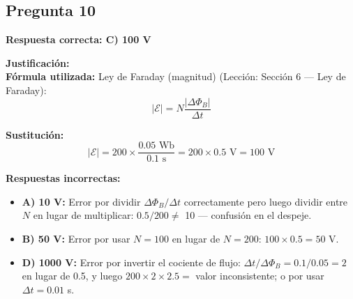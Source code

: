 \begin{respuestabox}
\subsection{Pregunta 10}
\textcolor{verdecorrecto}{\textbf{Respuesta correcta: C) 100 V}}

\textbf{Justificación:}\\
\textbf{Fórmula utilizada:} Ley de Faraday (magnitud) (Lección: Sección 6 — Ley de Faraday):
$$|\mathcal{E}| = N \frac{|\Delta\Phi_B|}{\Delta t}$$

\textbf{Sustitución:}
$$|\mathcal{E}| = 200 \times \frac{0.05 \text{ Wb}}{0.1 \text{ s}} = 200 \times 0.5 \text{ V} = 100 \text{ V}$$

\textbf{Respuestas incorrectas:}
\begin{itemize}
    \item \textbf{A) 10 V:} Error por dividir $\Delta\Phi_B / \Delta t$ correctamente pero luego dividir entre $N$ en lugar de multiplicar: $0.5/200 \neq$ 10 — confusión en el despeje.
    \item \textbf{B) 50 V:} Error por usar $N = 100$ en lugar de $N = 200$: $100 \times 0.5 = 50$ V.
    \item \textbf{D) 1000 V:} Error por invertir el cociente de flujo: $\Delta t / \Delta\Phi_B = 0.1/0.05 = 2$ en lugar de 0.5, y luego $200 \times 2 \times 2.5 = $ valor inconsistente; o por usar $\Delta t = 0.01$ s.
\end{itemize}
\end{respuestabox}

